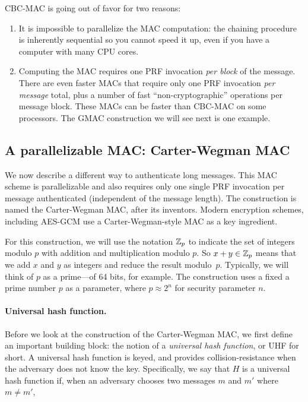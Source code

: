 CBC-MAC is going out of favor for two reasons:
\begin{enumerate}
  \item It is impossible to parallelize the MAC computation:
        the chaining procedure is inherently sequential so you 
        cannot speed it up, even if you have a computer with many 
        CPU cores.
  \item Computing the MAC requires one PRF invocation \emph{per block} of the message.
        There are even faster MACs that require only one PRF invocation
        \emph{per message} total, 
        plus a number of fast ``non-cryptographic'' operations
        per message block.
        These MACs can be faster than CBC-MAC on some processors.
        The GMAC construction we will see next is one example.
\end{enumerate}


\subsection{A parallelizable MAC: Carter-Wegman MAC}\label{sec:mac:cw}

We now describe a different way to authenticate long messages.
This MAC scheme is parallelizable and also requires only one 
single PRF invocation per message authenticated (independent of
the message length).
The construction is named the Carter-Wegman MAC, after its
inventors.\autocite{CW81}
Modern encryption schemes, including AES-GCM %
use a Carter-Wegman-style MAC as a key ingredient.

For this construction, we will use the notation
$\mathbb{Z}_p$ to indicate the set of integers modulo $p$
with addition and multiplication modulo $p$.
So $x + y \in \mathbb{Z}_p$ means that we add $x$ and $y$
as integers and reduce the result modulo~$p$.
Typically, we will think of $p$ as a prime---of
64 bits, for example.
The construction uses a fixed a prime number $p$ as a parameter,
where $p \approx 2^n$ for security parameter $n$.

\paragraph{Universal hash function.}

Before we look at the construction of the Carter-Wegman MAC, we first
define an important building block: the notion of a \emph{universal hash
function}, or UHF for short.  A universal hash function is keyed, and
provides collision-resistance when the adversary does not know the key.
Specifically, we say that $H$ is a universal hash function if, when an
adversary chooses two messages $m$ and $m'$ where $m\neq m'$,

